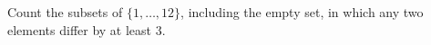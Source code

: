 Count the subsets of $\{1,\ldots,12\}$, including the empty set, in which any two elements differ by at least $3$.
